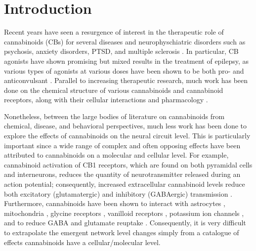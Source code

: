 \documentclass[11pt,a4paper,final]{article}
\begin{document}
\section{Introduction \label{intro}}

Recent years have seen a resurgence of interest in the therapeutic role of cannabinoids (CBs) for several diseases and neurophyschiatric disorders such as psychosis, anxiety disorders, PTSD, and multiple sclerosis \citep{koppel14,fattore15}.
In particular, CB agonists have shown promising but mixed results in the treatment of epilepsy, as various types of agonists at various doses have been shown to be both pro- and anticonvulsant \citep{wallace01,blair06,deshpande07,rudenko12,katona15,hill13,katona15}.
Parallel to increasing therapeutic research, much work has been done on the chemical structure of various cannabinoids and cannabinoid receptors, along with their cellular interactions and pharmacology \citep{mechoulam14}.

Nonetheless, between the large bodies of literature on cannabinoids from chemical, disease, and behavioral perspectives, much less work has been done to explore the effects of cannabinoids on the neural circuit level.
This is particularly important since a wide range of complex and often opposing effects have been attributed to cannabinoids on a molecular and cellular level.
For example, cannabinoid activation of CB1 receptors, which are found on both pyramidal cells and interneurons, reduces the quantity of neurotransmitter released during an action potential; consequently, increased extracellular cannabinoid levels reduce both excitatory (glutamatergic) and inhibitory (GABAergic) transmission \citep{ozaita12}.
Furthermore, cannabinoids have been shown to interact with astrocytes \citep{metna15}, mitochondria \citep{benard12}, glycine receptors \citep{xiong11}, vanilloid receptors \citep{fawley14}, potassium ion channels \citep{gantz17}, and to reduce GABA and glutamate reuptake \citep{coull97,brown03}.
Consequently, it is very difficult to extrapolate the emergent network level changes simply from a catalogue of effects cannabinoids have a cellular/molecular level.
\end{document}
